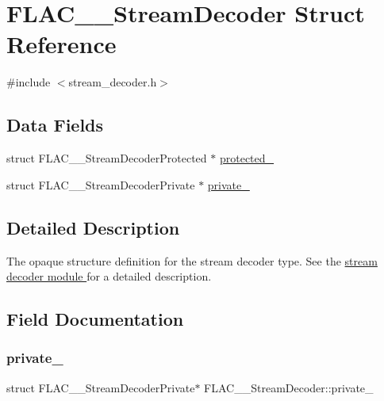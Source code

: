 \hypertarget{struct_f_l_a_c_____stream_decoder}{}\section{F\+L\+A\+C\+\_\+\+\_\+\+Stream\+Decoder Struct Reference}
\label{struct_f_l_a_c_____stream_decoder}


{\ttfamily \#include $<$stream\+\_\+decoder.\+h$>$}

\subsection*{Data Fields}
\begin{DoxyCompactItemize}
\item 
struct F\+L\+A\+C\+\_\+\+\_\+\+Stream\+Decoder\+Protected $\ast$ \hyperlink{struct_f_l_a_c_____stream_decoder_a17beb7a75f968592700bddec512f204d}{protected\+\_\+}
\item 
struct F\+L\+A\+C\+\_\+\+\_\+\+Stream\+Decoder\+Private $\ast$ \hyperlink{struct_f_l_a_c_____stream_decoder_a3a894a4d1204155c5a4e4add9d8f75f9}{private\+\_\+}
\end{DoxyCompactItemize}


\subsection{Detailed Description}
The opaque structure definition for the stream decoder type. See the \hyperlink{group__flac__stream__decoder}{stream decoder module } for a detailed description. 

\subsection{Field Documentation}
\mbox{\label{struct_f_l_a_c_____stream_decoder_a3a894a4d1204155c5a4e4add9d8f75f9}} 
\subsubsection{\texorpdfstring{private\+\_\+}{private\_}}
{\footnotesize\ttfamily struct F\+L\+A\+C\+\_\+\+\_\+\+Stream\+Decoder\+Private$\ast$ F\+L\+A\+C\+\_\+\+\_\+\+Stream\+Decoder\+::private\+\_\+}

